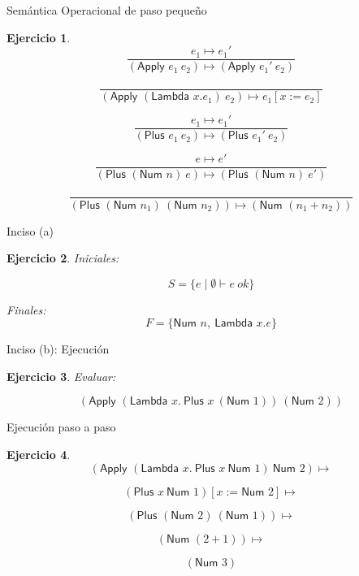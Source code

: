 \documentclass[11pt]{beamer}
\newtheorem{exercise}{Ejercicio}
\begin{document}
\begin{frame}{Semántica Operacional de paso pequeño}
	\begin{exercise}
		
		\[
		\frac{e_1 \mapsto e_1'}
		{(\textsf{Apply } e_1\ e_2) \mapsto (\textsf{Apply } e_1'\ e_2)}
		\]
		
		\[
		\frac{\ }
		{(\textsf{Apply } (\textsf{Lambda } x.e_1)\ e_2)
			\mapsto e_1[x := e_2]}
		\]
		
		\[
		\frac{e_1 \mapsto e_1'}
		{(\textsf{Plus } e_1\ e_2) \mapsto (\textsf{Plus } e_1'\ e_2)}
		\]
		
		\[
		\frac{e \mapsto e'}
		{(\textsf{Plus } (\textsf{Num } n)\ e) \mapsto (\textsf{Plus } (\textsf{Num } n)\ e')}
		\]
		
		\[
		\frac{\ }
		{(\textsf{Plus } (\textsf{Num } n_1)\ (\textsf{Num } n_2))
			\mapsto (\textsf{Num } (n_1 + n_2))}
		\]
	\end{exercise}
\end{frame}

\begin{frame}{Inciso (a)}
	\begin{exercise}
		Iniciales:
		
		\[
		S = \{ e \mid \emptyset \vdash e\ ok \}
		\]
		
		Finales:
		\[
		F = \{ \textsf{Num } n,\ \textsf{Lambda } x.e \}
		\]
	\end{exercise}
\end{frame}

\begin{frame}{Inciso (b): Ejecución}
	\begin{exercise}
		Evaluar:
		
		\[
		(\textsf{Apply } (\textsf{Lambda } x.\ 
		\textsf{Plus } x\ (\textsf{Num } 1))\ (\textsf{Num } 2))
		\]
	\end{exercise}
\end{frame}

\begin{frame}{Ejecución paso a paso}
	\begin{exercise}
		\[
		(\textsf{Apply } (\textsf{Lambda } x.\ 
		\textsf{Plus } x\ \textsf{Num } 1)\  \textsf{Num } 2) \mapsto
		\]
		
		\[
		(\textsf{Plus } x\ \textsf{Num } 1)[x := \textsf{Num } 2]	\mapsto
		\]
		
		\[
		(\textsf{Plus } (\textsf{Num } 2)\ (\textsf{Num } 1)) \mapsto
		\]
		
		\[
		(\textsf{Num } (2 + 1))	\mapsto
		\]
		
		\[
		(\textsf{Num } 3)
		\]
	\end{exercise}
\end{frame}
\end{document}
